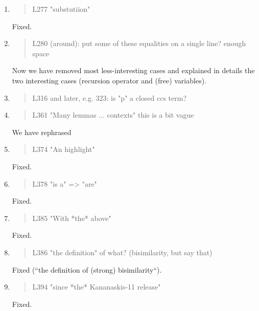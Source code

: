 \begin{enumerate}
\item \begin{quote}
    L277 "substutiion"
  \end{quote}
  Fixed.
  
\item \begin{quote}
    L280 (around): put some of these equalities on a single line? enough space
  \end{quote}
  Now we have removed most less-interesting cases and explained in
  details the two interesting cases (recursion operator and (free) variables).
  
\item \begin{quote}
    L316 and later, e.g. 323: is "p" a closed ccs term?
  \end{quote}

\item \begin{quote}
    L361 "Many lemmas ... contexts" this is a bit vague
  \end{quote}

We have rephrased
  
\item \begin{quote}
    L374 "An highlight"
  \end{quote}
  Fixed.  %
  
\item \begin{quote}
    L378 "is a" => "are"
  \end{quote}
  Fixed.  
  
\item \begin{quote}
    L385 "With *the* above"
  \end{quote}
  Fixed.
  
\item \begin{quote}
    L386 "the definition" of what? (bisimilarity, but say that)
  \end{quote}
  Fixed (``the definition of (strong) bisimilarity``).
  
\item \begin{quote}
    L394 "since *the* Kananaskis-11 release"
  \end{quote}
  Fixed.


\end{enumerate}
